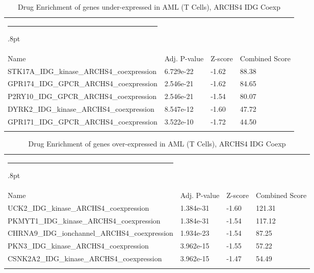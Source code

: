 \documentclass[3p,authoryear,preprint,12pt]{elsarticle}
\makeatletter
\def\hlinewd#1{%
  \noalign{\ifnum0=`}\fi\hrule \@height #1%
  \futurelet\reserved@a\@xhline}
\def\tbltoprule{\hlinewd{.8pt}\\[-12pt]}
\def\tblbottomrule{\noalign{\vspace*{6pt}}\hline\noalign{\vspace*{2pt}}}
\def\tblmidrule{\noalign{\vspace*{6pt}}\hline\noalign{\vspace*{2pt}}}
\makeatother
\begin{document}
\begin{table}[!htbp]
	\caption{{Drug Enrichment of genes under-expressed in AML (T Cells), ARCHS4 IDG Coexp} }
	\label{tw-de478ae31xc6}
	\def\arraystretch{1}
	\ignorespaces 
	\centering 
	\begin{tabulary}{\linewidth}{p{\dimexpr.65\tabcolsep}p{\dimexpr.15\tabcolsep}p{\dimexpr.1\tabcolsep}p{\dimexpr.1\tabcolsep}}
		\tbltoprule Name & Adj. P-value & Z-score & Combined Score\\
		\tblmidrule
STK17A\_IDG\_kinase\_ARCHS4\_coexpression & 6.729e-22 & -1.62 & 88.38 \\
GPR174\_IDG\_GPCR\_ARCHS4\_coexpression & 2.546e-21 & -1.62 & 84.65 \\
P2RY10\_IDG\_GPCR\_ARCHS4\_coexpression & 2.546e-21 & -1.54 & 80.07 \\
DYRK2\_IDG\_kinase\_ARCHS4\_coexpression & 8.547e-12 & -1.60 & 47.72 \\
GPR171\_IDG\_GPCR\_ARCHS4\_coexpression & 3.522e-10 & -1.72 & 44.50 \\
		\tblbottomrule
	\end{tabulary}\par 
\end{table}
\begin{table}[!htbp]
	\caption{{Drug Enrichment of genes over-expressed in AML (T Cells), ARCHS4 IDG Coexp} }
	\label{tw-de478ae31yc6}
	\def\arraystretch{1}
	\ignorespaces 
	\centering 
	\begin{tabulary}{\linewidth}{p{\dimexpr.65\tabcolsep}p{\dimexpr.15\tabcolsep}p{\dimexpr.1\tabcolsep}p{\dimexpr.1\tabcolsep}}
		\tbltoprule Name & Adj. P-value & Z-score & Combined Score\\
		\tblmidrule
UCK2\_IDG\_kinase\_ARCHS4\_coexpression & 1.384e-31 & -1.60 & 121.31 \\
PKMYT1\_IDG\_kinase\_ARCHS4\_coexpression & 1.384e-31 & -1.54 & 117.12 \\
CHRNA9\_IDG\_ionchannel\_ARCHS4\_coexpression & 1.934e-23 & -1.54 & 87.25 \\
PKN3\_IDG\_kinase\_ARCHS4\_coexpression & 3.962e-15 & -1.55 & 57.22 \\
CSNK2A2\_IDG\_kinase\_ARCHS4\_coexpression & 3.962e-15 & -1.47 & 54.49 \\
		\tblbottomrule
	\end{tabulary}\par 
\end{table}
\end{document}
